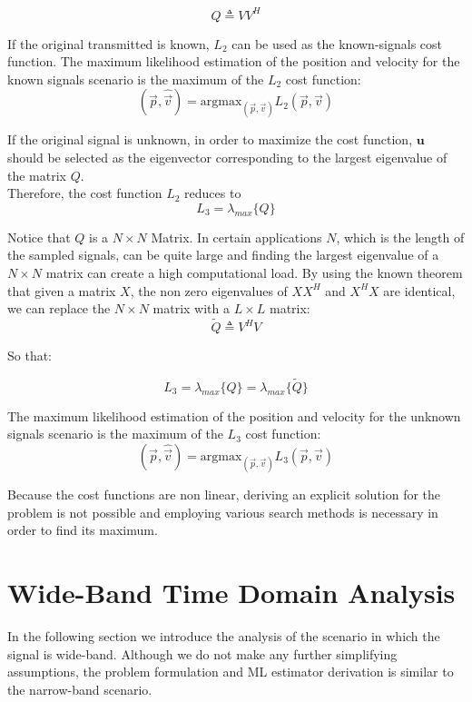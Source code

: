 \begin{equation}
Q \triangleq V V^H
\end{equation}

If the original transmitted is known, $L_2$ can be used as the known-signals cost function.
The maximum likelihood estimation of the position and velocity for the known signals scenario is the maximum of the $L_2$ cost function:
\begin{equation}
(\hat{\vec{p}},\hat{\vec{v}}) = \text{argmax}_{(\vec{p},\vec{v})}L_2(\vec{p},\vec{v})
\end{equation}

If the original signal is unknown, in order to maximize the cost function, $\mathbf{u}$ should be selected as the eigenvector corresponding to the largest eigenvalue of the matrix $Q$.\\

Therefore, the cost function $L_2$ reduces to
\begin{equation}
L_3= \lambda_{max} \{Q\}
\end{equation}

Notice that $Q$ is a $N \times N$ Matrix. In certain applications $N$, which is the length of the sampled signals, can be quite large and finding the largest eigenvalue of a $N \times N$ matrix can create a high computational load.
By using the known theorem that given a matrix $X$, the non zero eigenvalues of $XX^H$ and $X^H X$ are identical, we can replace the $N \times N$ matrix with a $L \times L$ matrix: 
\begin{equation}
\tilde{Q} \triangleq  V^H V 
\end{equation}

So that:

\begin{equation}
L_3= \lambda_{max} \{Q\} = \lambda_{max} \{\tilde{Q}\}
\end{equation}

The maximum likelihood estimation of the position and velocity for the unknown signals scenario is the maximum of the $L_3$ cost function:
\begin{equation}
(\hat{\vec{p}},\hat{\vec{v}}) = \text{argmax}_{(\vec{p},\vec{v})}L_3(\vec{p},\vec{v})
\end{equation}

Because the cost functions are non linear, deriving an explicit solution for the problem is not possible and employing various search methods is necessary in order to find its maximum.


\section{Wide-Band Time Domain Analysis}
In the following section we introduce the analysis of the scenario in which the signal is wide-band. 
Although we do not make any further simplifying assumptions, the problem formulation and ML estimator derivation is similar to the narrow-band scenario.\\

